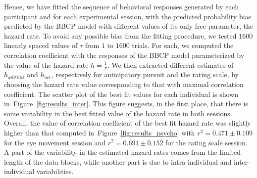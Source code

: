 \documentclass[10pt,letterpaper]{article}
\newcommand{\seeFig}[1]{Figure~\ref{fig:#1}}
\newcommand{\CP}[1]{\textbf{\textcolor{green}{[CP: #1]}}}
\begin{document}
Hence, we have fitted the sequence of behavioral responses generated by each participant and
for each experimental session, with the predicted probability bias predicted by the BBCP model
with different values of its only free parameter, the hazard rate.
To avoid any possible bias from the fitting procedure,
we tested $1600$ linearly spaced values of $\tau$ from $1$ to $1600$ trials.
For each, we computed the correlation coefficient with the responses of the BBCP model parameterized
by the value of the hazard rate $h = \frac 1 \tau$.
We then extracted different estimates of $h_{\text{aSPEM}}$ and $h_{\text{bet}}$,
respectively for anticipatory pursuit and the rating scale,
by choosing the hazard rate value corresponding to that with maximal correlation coefficient.
The scatter plot of the best fit values for each individual is shown in~\seeFig{results_inter}.
This figure suggests, in the first place, that there is some variability
in the best fitted value of the hazard rate in both sessions.
Overall, the value of correlation coefficient of the best fit hazard rate
was slightly higher than that computed in~\seeFig{results_psycho}
with $r^{2} = 0.471 \pm 0.109$ for the eye movement session
 and $r^{2} = 0.691 \pm 0.152$ for the rating scale session.
A part of the variability in the estimated hazard rates comes
from the limited length of the data blocks,
while another part is due to intra-individual and inter-individual variabilities.
\end{document}
